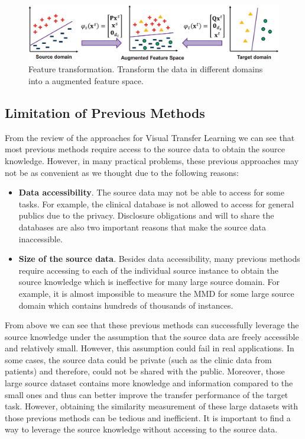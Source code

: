 \begin{figure}
	\centering
	\includegraphics[scale=.3]{introduction/fig/transformation.png}
	\caption{Feature transformation. Transform the data in different domains into a augmented feature space.}\label{fig:intro:trans}
\end{figure}

\subsection{Limitation of Previous Methods}
From the review of the approaches for Visual Transfer Learning we can see that
most previous methods require access to the source data to obtain the source knowledge. However, in many practical problems, these previous approaches may not be as convenient as we thought due to the following reasons:

\begin{itemize}
	\item \textbf{Data accessibility}. The source data may not be able to access for some tasks. For example, the clinical database is not allowed to access for general publics due to the privacy. Disclosure obligations and will to share the databases are also two important reasons that make the source data inaccessible.
	\item \textbf{Size of the source data}. Besides data accessibility, many previous methods \cite{daume2009frustratingly}\cite{duan2012learning} require accessing to each of the individual source instance to obtain the source knowledge which is ineffective for many large source domain. For example, it is almost impossible to measure the MMD for some large source domain which contains hundreds of thousands of instances.
\end{itemize}

From above we can see that these previous methods can successfully leverage the source knowledge under the assumption that the source data are freely accessible and relatively small. However, this assumption could fail in real applications. In some cases, the source data could be private (such as the clinic data from patients) and therefore, could not be shared with the public. Moreover, those large source dataset contains more knowledge and information compared to the small ones and thus can better improve the transfer performance of the target task. However, obtaining the similarity measurement of these large datasets with those previous methods can be tedious and inefficient. It is important to find a way to leverage the source knowledge without accessing to the source data.

